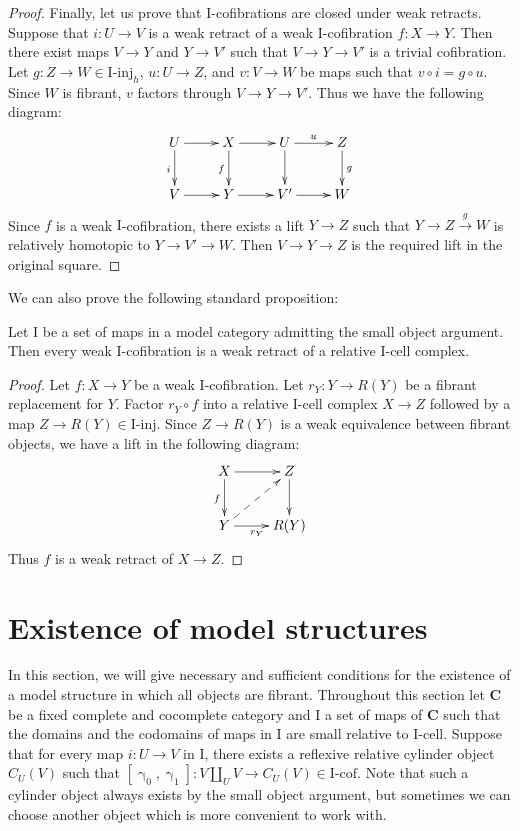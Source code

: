 \documentclass{tac}
\theoremstyle{definition}
\newcommand{\cat}[1]{\mathbf{#1}}
\newcommand{\C}{\cat{C}}
\newcommand{\I}{\mathrm{I}}
\newcommand{\class}[2]{#1\text{-}\mathrm{#2}}
\newcommand{\Iinj}[1][\I]{\class{#1}{inj}}
\newcommand{\Icell}[1][\I]{\class{#1}{cell}}
\newcommand{\Icof}[1][\I]{\class{#1}{cof}}
\newcommand{\cyli}{\upgamma}
\begin{document}
\begin{proof}
Finally, let us prove that $\I$-cofibrations are closed under weak retracts.
Suppose that $i : U \to V$ is a weak retract of a weak $\I$-cofibration $f : X \to Y$.
Then there exist maps $V \to Y$ and $Y \to V'$ such that $V \to Y \to V'$ is a trivial cofibration.
Let $g : Z \to W \in \Iinj_h$, $u : U \to Z$, and $v : V \to W$ be maps such that $v \circ i = g \circ u$.
Since $W$ is fibrant, $v$ factors through $V \to Y \to V'$.
Thus we have the following diagram:
\[ \xymatrix{ U \ar[r] \ar[d]_i & X \ar[r] \ar[d]_f & U \ar[r]^u \ar[d] & Z \ar[d]^g \\
              V \ar[r]          & Y \ar[r]          & V' \ar[r]         & W
            } \]
Since $f$ is a weak $\I$-cofibration, there exists a lift $Y \to Z$ such that $Y \to Z \xrightarrow{g} W$ is relatively homotopic to $Y \to V' \to W$.
Then $V \to Y \to Z$ is the required lift in the original square.
\end{proof}

We can also prove the following standard proposition:

\begin{prop}
Let $\I$ be a set of maps in a model category admitting the small object argument.
Then every weak $\I$-cofibration is a weak retract of a relative $\I$-cell complex.
\end{prop}
\begin{proof}
Let $f : X \to Y$ be a weak $\I$-cofibration.
Let $r_Y : Y \to R(Y)$ be a fibrant replacement for $Y$.
Factor $r_Y \circ f$ into a relative $\I$-cell complex $X \to Z$ followed by a map $Z \to R(Y) \in \Iinj$.
Since $Z \to R(Y)$ is a weak equivalence between fibrant objects, we have a lift in the following diagram:
\[ \xymatrix{ X \ar[r] \ar[d]_f             & Z \ar[d] \\
              Y \ar[r]_{r_Y} \ar@{-->}[ur]  & R(Y)
            } \]
Thus $f$ is a weak retract of $X \to Z$.
\end{proof}

\section{Existence of model structures}
\label{sec:exist}

In this section, we will give necessary and sufficient conditions for the existence of a model structure in which all objects are fibrant.
Throughout this section let $\C$ be a fixed complete and cocomplete category and $\I$ a set of maps of $\C$
such that the domains and the codomains of maps in $\I$ are small relative to $\Icell$.
Suppose that for every map $i : U \to V$ in $\I$, there exists a reflexive relative cylinder object $C_U(V)$ such that $[\cyli_0,\cyli_1] : V \amalg_U V \to C_U(V) \in \Icof$.
Note that such a cylinder object always exists by the small object argument, but sometimes we can choose another object which is more convenient to work with.
\end{document}
